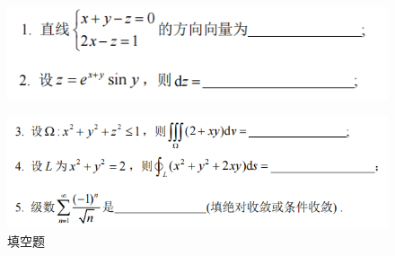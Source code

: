 \documentclass[a4paper,12pt]{ctexrep}
\begin{document}
\begin{figure}[H]
\centering
\includegraphics[width=1\textwidth]{20250526/2.png} 
\end{figure}
\begin{figure}[H]
	\centering
	\includegraphics[width=1\textwidth]{20250526/3.png} 
	\caption{填空题} 
\end{figure}
\end{document}
